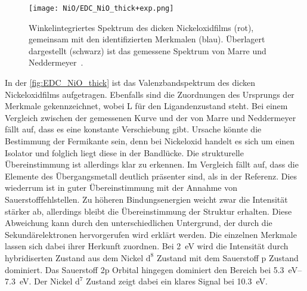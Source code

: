         \begin{figure}
            \centering
            \texttt{[image: NiO/EDC\_NiO\_thick+exp.png]}
            \caption{Winkelintegriertes Spektrum des dicken Nickeloxidfilms (rot), gemeinsam mit den identifizierten Merkmalen (blau).
            Überlagert dargestellt (schwarz) ist das gemessene Spektrum von Marre und Neddermeyer~\cite{NiO_7}.} 
            \label{fig:EDC_NiO_thick}
        \end{figure}
        In der \autoref{fig:EDC_NiO_thick} ist das Valenzbandspektrum des dicken Nickeloxidfilms aufgetragen.
        Ebenfalls sind die Zuordnungen des Ursprungs der Merkmale gekennzeichnet, wobei L für den Ligandenzustand steht.
        Bei einem Vergleich zwischen der gemessenen Kurve und der von Marre und Neddermeyer~\cite{NiO_7} fällt auf, dass es eine konstante Verschiebung gibt.
        Ursache könnte die Bestimmung der Fermikante sein, denn bei Nickeloxid handelt es sich um einen Isolator und folglich liegt diese in der Bandlücke.
        Die strukturelle Übereinstimmung ist allerdings klar zu erkennen. 
        Im Vergleich fällt auf, dass die Elemente des Übergangsmetall deutlich präsenter sind, als in der Referenz.
        Dies wiederrum ist in guter Übereinstimmung mit der Annahme von Sauerstofffehlstellen.
        Zu höheren Bindungsenergien weicht zwar die Intensität stärker ab, allerdings bleibt die Übereinstimmung der Struktur erhalten.
        Diese Abweichung kann durch den unterschiedlichen Untergrund, der durch die Sekundärelektronen hervorgerufen wird erklärt werden.
        Die einzelnen Merkmale lassen sich dabei ihrer Herkunft zuordnen. 
        Bei \SI{2}{\electronvolt} wird die Intensität durch hybridiserten Zustand aus dem Nickel $\text{d}^8$ Zustand mit dem Sauerstoff p Zustand dominiert.
        Das Sauerstoff 2p Orbital hingegen dominiert den Bereich bei \SIrange[range-phrase=\:und\:]{5.3}{7.3}{\electronvolt}.
        Der Nickel $\text{d}^7$ Zustand zeigt dabei ein klares Signal bei \SI{10.3}{\electronvolt}.

